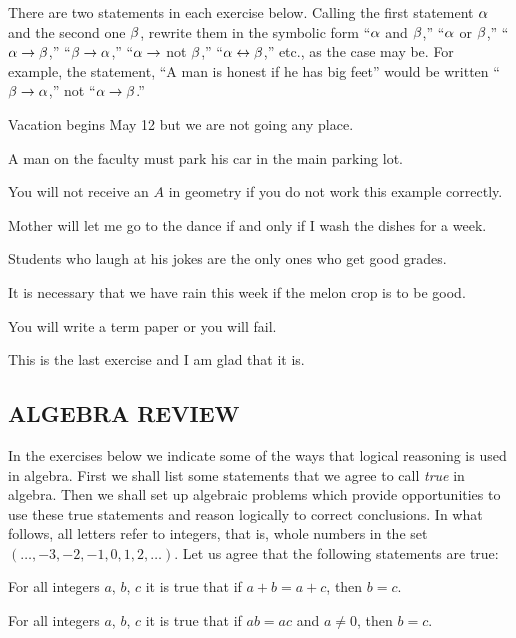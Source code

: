\documentclass[11pt]{book}
\begin{document}
There are two statements in each exercise below. Calling the first statement $\alpha$
and the second one $\beta$, rewrite them in the symbolic form ``$\alpha$ and $\beta$,''
``$\alpha$ or $\beta$,'' ``$\alpha \rightarrow \beta$,'' ``$\beta \rightarrow \alpha$,'' ``$\alpha \rightarrow$ not
$\beta$,'' ``$\alpha \leftrightarrow \beta$,'' etc., as the case may be. For example, the statement,
``A man is honest if he has big feet'' would be written ``$\beta \rightarrow \alpha$,'' not
``$\alpha \rightarrow \beta$.''

\begin{exlist}\setcounter{exlisti}{13}
\item Vacation begins May 12 but we are not going any place.
\item A man on the faculty must park his car in the main parking lot.
\item You will not receive an $A$ in geometry if you do not work this example
      correctly.
\item Mother will let me go to the dance if and only if I wash the dishes for a
      week.
\item Students who laugh at his jokes are the only ones who get good grades.
\item It is necessary that we have rain this week if the melon crop is to be good.
\item You will write a term paper or you will fail.
\item This is the last exercise and I am glad that it is.
\end{exlist}

\subsection*{ALGEBRA REVIEW}

In the exercises below we indicate some of the ways that logical reasoning is used
in algebra. First we shall list some statements that we agree to call \emph{true}
in algebra. Then we shall set up algebraic problems which provide opportunities to
use these true statements and reason logically to correct conclusions. In what
follows, all letters refer to integers, that is, whole numbers in the set
$(\dots, -3, -2, -1, 0, 1, 2, \dots)$. Let us agree that the following statements
are true:

\begin{exlist}
\item For all integers $a$, $b$, $c$ it is true that if $a + b = a + c$, then
      $b = c$.
\item For all integers $a$, $b$, $c$ it is true that if $ab = ac$ and $a \neq 0$,
      then $b = c$.
\end{exlist}
\end{document}
